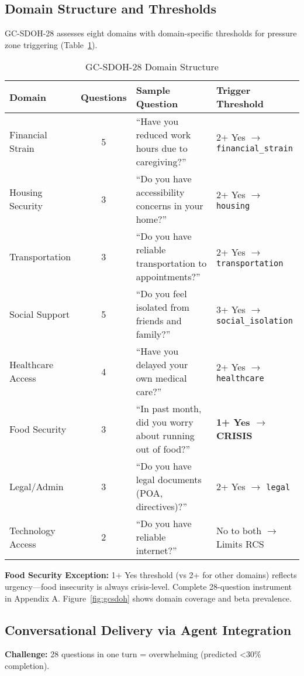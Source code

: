 \documentclass{article}
\begin{document}
%
\subsection{Domain Structure and Thresholds}%
\label{subsec:DomainStructureandThresholds}%
GC-SDOH-28 assesses eight domains with domain-specific thresholds for pressure zone triggering (Table~\ref{table:sdoh_domains}).

\begin{table}[h]
\centering
\caption{GC-SDOH-28 Domain Structure}
\label{table:sdoh_domains}
\small
\begin{tabular}{p{2.5cm}cp{4.5cm}p{2.8cm}}
\toprule
\textbf{Domain} & \textbf{Questions} & \textbf{Sample Question} & \textbf{Trigger Threshold} \\
\midrule
Financial Strain & 5 & ``Have you reduced work hours due to caregiving?'' & 2+ Yes $\rightarrow$ \texttt{financial\_strain} \\
Housing Security & 3 & ``Do you have accessibility concerns in your home?'' & 2+ Yes $\rightarrow$ \texttt{housing} \\
Transportation & 3 & ``Do you have reliable transportation to appointments?'' & 2+ Yes $\rightarrow$ \texttt{transportation} \\
Social Support & 5 & ``Do you feel isolated from friends and family?'' & 3+ Yes $\rightarrow$ \texttt{social\_isolation} \\
Healthcare Access & 4 & ``Have you delayed your own medical care?'' & 2+ Yes $\rightarrow$ \texttt{healthcare} \\
Food Security & 3 & ``In past month, did you worry about running out of food?'' & \textbf{1+ Yes $\rightarrow$ CRISIS} \\
Legal/Admin & 3 & ``Do you have legal documents (POA, directives)?'' & 2+ Yes $\rightarrow$ \texttt{legal} \\
Technology Access & 2 & ``Do you have reliable internet?'' & No to both $\rightarrow$ Limits RCS \\
\bottomrule
\end{tabular}
\end{table}

\textbf{Food Security Exception:} 1+ Yes threshold (vs 2+ for other domains) reflects urgency—food insecurity is always crisis-level. Complete 28-question instrument in Appendix A. Figure~\ref{fig:gcsdoh} shows domain coverage and beta prevalence.

%
\subsection{Conversational Delivery via Agent Integration}%
\label{subsec:ConversationalDeliveryviaAgentIntegration}%
\textbf{Challenge:} 28 questions in one turn = overwhelming (predicted <30\% completion).
\end{document}
